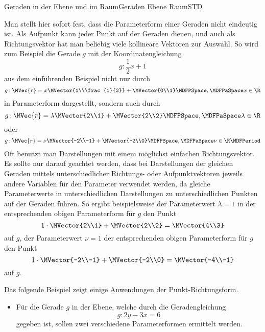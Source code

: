 \begin{MXContent}{Geraden in der Ebene und im Raum}{Geraden Ebene Raum}{STD}
\begin{MInfo}
\end{MInfo}

Man stellt hier sofort fest, dass die Parameterform einer Geraden nicht eindeutig ist. Als Aufpunkt kann jeder Punkt auf der Geraden dienen, und auch als Richtungsvektor hat man beliebig viele 
kollineare Vektoren zur Auswahl. So wird zum Beispiel die Gerade $g$ mit der Koordinatengleichung
\[
 g\colon\frac{1}{2}x+1 
\]
aus dem einführenden Beispiel nicht nur durch 
\[
 g\colon \MVec{r}=x\MVector{1\\\frac{1}{2}}+\MVector{0\\1}\MDFPSpace,\MDFPaSpace x\in\R
\]
in Parameterform dargestellt, sondern auch durch 
\[
 g\colon \MVec{r}=\lambda\MVector{2\\1}+\MVector{2\\2}\MDFPSpace,\MDFPaSpace \lambda\in\R
\]
oder
\[
 g\colon \MVec{r}=\nu\MVector{-2\\-1}+\MVector{-2\\0}\MDFPSpace,\MDFPaSpace \nu\in\R \MDFPeriod
\]
Oft benutzt man Darstellungen mit einem möglichst einfachen Richtungsvektor. Es sollte nur darauf geachtet werden, dass bei Darstellungen der gleichen Geraden mittels unterschiedlicher Richtungs- oder Aufpunktvektoren jeweils andere Variablen für den Parameter verwendet werden, da gleiche Parameterwerte in unterschiedlichen Darstellungen zu unterschiedlichen Punkten auf der Geraden führen. So ergibt beispielsweise der Parameterwert $\lambda=1$ in der entsprechenden obigen Parameterform für $g$ den Punkt
\[
 1\cdot\MVector{2\\1}+\MVector{2\\2}=\MVector{4\\3}
\]
auf $g$, der Parameterwert $\nu=1$ der entsprechenden obigen Parameterform für $g$ den Punkt
\[
 1\cdot\MVector{-2\\-1}+\MVector{-2\\0}=\MVector{-4\\-1}
\]
auf $g$.

Das folgende Beispiel zeigt einige Anwendungen der Punkt-Richtungsform.

\begin{MExample}
\begin{itemize}
 \item Für die Gerade $g$ in der Ebene, welche durch die Geradengleichung 
 \[
  g\colon 2y-3x=6
 \]
 gegeben ist, sollen zwei verschiedene Parameterformen ermittelt werden.
 

\end{itemize}
\end{MExample}
\end{MXContent}
